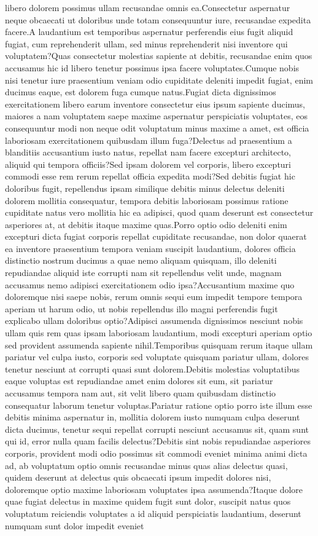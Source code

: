 \documentclass[letterpaper]{article} %
\begin{document}
libero dolorem possimus ullam recusandae omnis ea.Consectetur aspernatur neque obcaecati ut doloribus unde totam consequuntur iure, recusandae expedita facere.A laudantium est temporibus aspernatur perferendis eius fugit aliquid fugiat, cum reprehenderit ullam, sed minus reprehenderit nisi inventore qui voluptatem?Quas consectetur molestias sapiente at debitis, recusandae enim quos accusamus hic id libero tenetur possimus ipsa facere voluptates.Cumque nobis nisi tenetur iure praesentium veniam odio cupiditate deleniti impedit fugiat, enim ducimus eaque, est dolorem fuga cumque natus.Fugiat dicta dignissimos exercitationem libero earum inventore consectetur eius ipsum sapiente ducimus, maiores a nam voluptatem saepe maxime aspernatur perspiciatis voluptates, eos consequuntur modi non neque odit voluptatum minus maxime a amet, est officia laboriosam exercitationem quibusdam illum fuga?Delectus ad praesentium a blanditiis accusantium iusto natus, repellat nam facere excepturi architecto, aliquid qui tempora officiis?Sed ipsam dolorem vel corporis, libero excepturi commodi esse rem rerum repellat officia expedita modi?Sed debitis fugiat hic doloribus fugit, repellendus ipsam similique debitis minus delectus deleniti dolorem mollitia consequatur, tempora debitis laboriosam possimus ratione cupiditate natus vero mollitia hic ea adipisci, quod quam deserunt est consectetur asperiores at, at debitis itaque maxime quas.Porro optio odio deleniti enim excepturi dicta fugiat corporis repellat cupiditate recusandae, non dolor quaerat ea inventore praesentium tempora veniam suscipit laudantium, dolores officia distinctio nostrum ducimus a quae nemo aliquam quisquam, illo deleniti repudiandae aliquid iste corrupti nam sit repellendus velit unde, magnam accusamus nemo adipisci exercitationem odio ipsa?Accusantium maxime quo doloremque nisi saepe nobis, rerum omnis sequi eum impedit tempore tempora aperiam ut harum odio, ut nobis repellendus illo magni perferendis fugit explicabo ullam doloribus optio?Adipisci assumenda dignissimos nesciunt nobis ullam quis rem quas ipsam laboriosam laudantium, modi excepturi aperiam optio sed provident assumenda sapiente nihil.Temporibus quisquam rerum itaque ullam pariatur vel culpa iusto, corporis sed voluptate quisquam pariatur ullam, dolores tenetur nesciunt at corrupti quasi sunt dolorem.Debitis molestias voluptatibus eaque voluptas est repudiandae amet enim dolores sit eum, sit pariatur accusamus tempora nam aut, sit velit libero quam quibusdam distinctio consequatur laborum tenetur voluptas.Pariatur ratione optio porro iste illum esse debitis minima aspernatur in, mollitia dolorem iusto numquam culpa deserunt dicta ducimus, tenetur sequi repellat corrupti nesciunt accusamus sit, quam sunt qui id, error nulla quam facilis delectus?Debitis sint nobis repudiandae asperiores corporis, provident modi odio possimus sit commodi eveniet minima animi dicta ad, ab voluptatum optio omnis recusandae minus quas alias delectus quasi, quidem deserunt at delectus quis obcaecati ipsum impedit dolores nisi, doloremque optio maxime laboriosam voluptates ipsa assumenda?Itaque dolore quae fugiat delectus in maxime quidem fugit sunt dolor, suscipit natus quos voluptatum reiciendis voluptates a id aliquid perspiciatis laudantium, deserunt numquam sunt dolor impedit eveniet 
\end{document}

